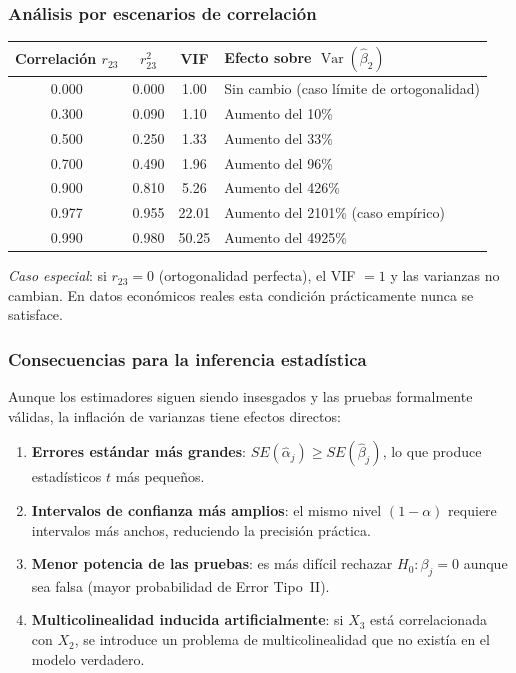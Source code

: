 \documentclass[12pt, letterpaper]{article}
\newcommand{\Var}{\operatorname{Var}}
\begin{document}
\subsubsection{Análisis por escenarios de correlación}

\begin{center}
\renewcommand{\arraystretch}{1.3}
\small
\begin{tabular}{cccp{5.8cm}}
\toprule
\textbf{Correlación $r_{23}$} & $r_{23}^2$ & \textbf{VIF} & \textbf{Efecto sobre $\Var(\hat{\beta}_2)$} \\
\midrule
0.000 & 0.000 &  1.00 & Sin cambio (caso límite de ortogonalidad) \\
0.300 & 0.090 &  1.10 & Aumento del 10\% \\
0.500 & 0.250 &  1.33 & Aumento del 33\% \\
0.700 & 0.490 &  1.96 & Aumento del 96\% \\
0.900 & 0.810 &  5.26 & Aumento del 426\% \\
0.977 & 0.955 & 22.01 & Aumento del 2101\% \quad (caso empírico) \\
0.990 & 0.980 & 50.25 & Aumento del 4925\% \\
\bottomrule
\end{tabular}
\end{center}

\textit{Caso especial}: si $r_{23} = 0$ (ortogonalidad perfecta), el
VIF $= 1$ y las varianzas no cambian. En datos económicos reales esta
condición prácticamente nunca se satisface.

\subsubsection{Consecuencias para la inferencia estadística}

Aunque los estimadores siguen siendo insesgados y las pruebas formalmente
válidas, la inflación de varianzas tiene efectos directos:

\begin{enumerate}[leftmargin=1.8em]
  \item \textbf{Errores estándar más grandes}: $SE(\hat{\alpha}_j) \geq
    SE(\hat{\beta}_j)$, lo que produce estadísticos $t$ más pequeños.
  \item \textbf{Intervalos de confianza más amplios}: el mismo nivel
    $(1-\alpha)$ requiere intervalos más anchos, reduciendo la precisión
    práctica.
  \item \textbf{Menor potencia de las pruebas}: es más difícil rechazar
    $H_0: \beta_j = 0$ aunque sea falsa (mayor probabilidad de Error
    Tipo~II).
  \item \textbf{Multicolinealidad inducida artificialmente}: si $X_3$
    está correlacionada con $X_2$, se introduce un problema de
    multicolinealidad que no existía en el modelo verdadero.
\end{enumerate}
\end{document}
